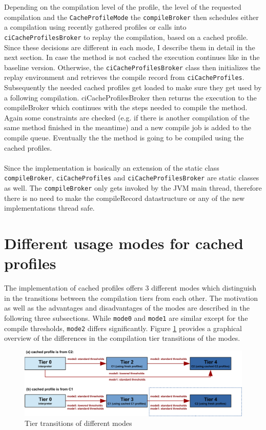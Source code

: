 Depending on the compilation level of the profile, the level of the requested compilation and the \texttt{CacheProfileMode} the \texttt{compileBroker} then schedules either a compilation using recently gathered profiles or calls into \texttt{ciCacheProfilesBroker} to replay the compilation, based on a cached profile. Since these decisions are different in each mode, I describe them in detail in the next section.
In case the method is not cached the execution continues like in the baseline version.
Otherwise, the \texttt{ciCacheProfilesBroker} class then initializes the replay environment and retrieves the compile record from \texttt{ciCacheProfiles}. Subsequently the needed cached profiles get loaded to make sure they get used by a following compilation. ciCacheProfilesBroker then returns the execution to the compileBroker which continues with the steps needed to compile the method. Again some constraints are checked (e.g. if there is another compilation of the same method finished in the meantime) and a new compile job is added to the compile queue. Eventually the the method is going to be compiled using the cached profiles.
\\\\
Since the implementation is basically an extension of the static class \texttt{compileBroker}, \texttt{ciCacheProfiles} and \texttt{ciCacheProfilesBroker} are static classes as well. The \texttt{compileBroker} only gets invoked by the JVM main thread, therefore there is no need to make the compileRecord datastructure or any of the new implementations thread safe. 

\section{Different usage modes for cached profiles}
\label{s:cacheprofilesmode}
The implementation of cached profiles offers 3 different modes which distinguish in the transitions between the compilation tiers from each other.
The motivation as well as the advantages and disadvantages of the modes are described in the following three subsections.
While \texttt{mode0} and \texttt{mode1} are similar except for the compile thresholds, \texttt{mode2} differs significantly.
Figure \ref{f:hs_tiers_thresholds} provides a graphical overview of the differences in the compilation tier transitions of the modes.
\begin{figure}[h]
  \begin{center}
    \centering
    \includegraphics{figures/hs_tiers_threshold.png}
    \caption{Tier transitions of different modes}
    \label{f:hs_tiers_thresholds}
  \end{center}
\end{figure}

